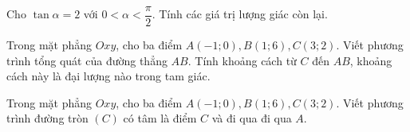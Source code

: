 \begin{bt}%
	Cho  $\tan \alpha=2$ với $0<\alpha<\dfrac{\pi}{2}$. Tính các giá trị lượng giác còn lại.
\end{bt}
\begin{bt}%
	Trong mặt phẳng $ Oxy $, cho ba điểm $ A(-1;0), B(1;6), C(3;2). $ Viết phương trình tổng quát của đường thẳng $ AB $. Tính khoảng cách từ $ C $ đến $ AB $, khoảng cách này là đại lượng nào trong tam giác.			
\end{bt}

	\begin{bt}%
		Trong mặt phẳng $ Oxy $, cho ba điểm $ A(-1;0), B(1;6), C(3;2).$ Viết phương trình đường tròn $ (C) $ có tâm là điểm $ C $ và đi qua đi qua $ A $.
	\end{bt}

